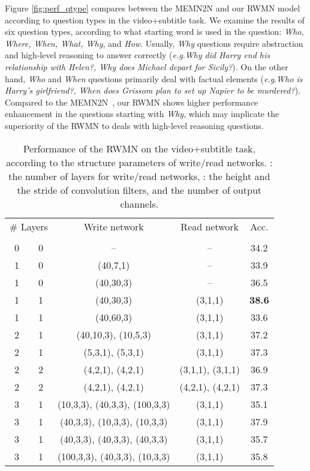 \documentclass[10pt,twocolumn,letterpaper]{article}
\makeatletter
\theoremstyle{nonumberplain}
\DeclareRobustCommand\onedot{\futurelet\@let@token\@onedot}
\def\onedot{.\@\xspace}
\def\eg{\emph{e.g}\onedot} \def\Eg{\emph{E.g}\onedot}
\makeatother
\begin{document}
Figure \ref{fig:perf_qtype} compares between the MEMN2N \cite{tapaswi2016movieqa} and our RWMN model according to question types in the video+subtitle task. 
We examine the results of six question types, according to what starting word is used in the question: \textit{Who, Where, When, What, Why}, and \textit{How}.
Usually, \textit{Why} questions require abstraction and high-level reasoning to answer correctly (\eg \textit{Why did Harry end his relationship with Helen?, Why does Michael depart for Sicily?}).
On the other hand, \textit{Who} and \textit{When} questions primarily deal with factual elements (\eg \textit{Who is Harry's girlfriend?, When does Grissom plan to set up Napier to be murdered?}).
Compared to the MEMN2N~\cite{tapaswi2016movieqa}, our RWMN shows higher performance enhancement in the questions starting with \textit{Why}, 
which may implicate the superiority of the RWMN to deals with high-level reasoning questions. 




\begin{table}[t]
\centering
\small
\setlength{\tabcolsep}{0.5em}
\begin{tabular}{cc|c|c|c}
\hline
\multicolumn{2}{c|}{\# Layers} & Write network  & Read network & Acc. \\
 &   &   &   & \\
\hline
0 & 0 & -- & -- & 34.2\\
\hline
1 & 0 & (40,7,1) & -- & 33.9\\
1 & 0 & (40,30,3) & -- & 36.5\\ 
1 & 1 & (40,30,3) & (3,1,1) & \textbf{38.6}\\
1 & 1 & (40,60,3) & (3,1,1) & 33.6\\
\hline
2 & 1 & (40,10,3), (10,5,3) & (3,1,1) & 37.2\\
2 & 1 & (5,3,1), (5,3,1) & (3,1,1) & 37.3\\
2 & 2 & (4,2,1), (4,2,1) & (3,1,1), (3,1,1) & 36.9\\
2 & 2 & (4,2,1), (4,2,1) & (4,2,1), (4,2,1) & 37.3\\
\hline
3 & 1 & (10,3,3), (40,3,3), (100,3,3) & (3,1,1) & 35.1\\
3 & 1 & (40,3,3), (10,3,3), (10,3,3) & (3,1,1) & 37.9\\
3 & 1 & (40,3,3), (40,3,3), (40,3,3) & (3,1,1) & 35.7\\
3 & 1 & (100,3,3), (40,3,3), (10,3,3) & (3,1,1) & 35.8\\ 
\hline
\end{tabular}
\vspace{6pt}
\caption{Performance of the RWMN on the video+subtitle task, according to the structure parameters of write/read networks.
: the number of layers for write/read networks, : the height and the stride of convolution filters, and the number of output channels.}
\label{tab:ablation}
\end{table}
\end{document}

